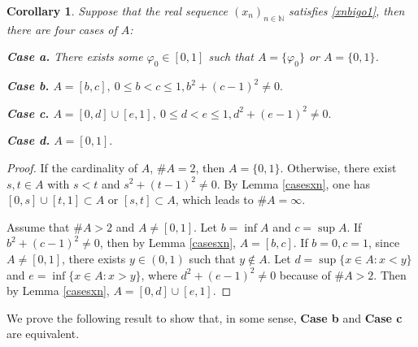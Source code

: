 \documentclass[12pt]{amsart}
\theoremstyle{plain}
\newtheorem{corollary}[theorem]{Corollary}
\theoremstyle{definition}
\begin{document}
\begin{corollary}
		Suppose that the real sequence $(x_n)_{n\in\mathbb{N}}$
	satisfies \eqref{xnbigo1}, then there are four cases of $A$:
	
	\textbf{Case a.} There exists some $\varphi_0\in [0,1]$ such that $A=\{\varphi_0\}$ or $A=\{0,1\}$.

	
	\textbf{Case b.} 
$A=[b,c],\ 0\leq b<c\leq 1, b^2+(c-1)^2\neq 0.$
	
	\textbf{Case c.}
	$A=[0,d]\cup [e,1], \ 0\leq d<e\leq 1,d^2+(e-1)^2\neq0.$
	
		\textbf{Case d.}
	$A=[0,1].$
\end{corollary}
\begin{proof}
If the cardinality of $A$, $\# A=2$, then $A=\{0,1\}$. Otherwise, there exist $s,t\in A$ with $s<t$ and $s^2+(t-1)^2\neq 0$. By Lemma \ref{casesxn}, one has $[0,s]\cup [t,1]\subset A$ or $[s,t]\subset A$, which leads to $\#A=\infty$.

Assume that $\#A >2$ and $A\neq [0,1]$. Let $b=\inf A$ and $c=\sup A$.
If $b^2+(c-1)^2\neq 0$, then by Lemma \ref{casesxn}, $A=[b,c]$.
 If $b=0,c=1$, since $A\neq [0,1]$, there exists $y\in (0,1)$ such that $y\notin A$. Let $d=\sup\{x\in A:x<y\}$ and $e=\inf\{x\in A:x>y\}$, where $d^2+(e-1)^2\neq 0$ because of $\#A>2$. Then by Lemma \ref{casesxn}, $A=[0,d]\cup[e,1]$.
\end{proof}

We prove the following result to show that, in some sense, \textbf{Case b} and \textbf{Case c} are equivalent.
\end{document}
